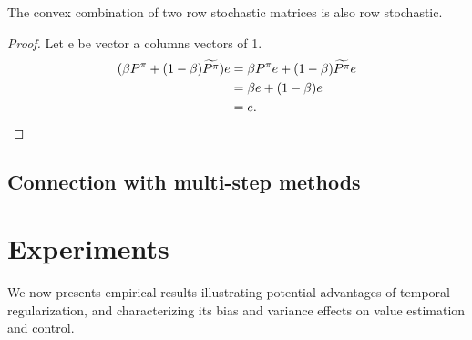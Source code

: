 \begin{lemma}
\label{lem:stochastic_matrix_convex_combination}
The convex combination of two row stochastic matrices is also row stochastic.
\end{lemma}
\begin{proof}
Let e be vector a columns vectors of 1.
\begin{equation}
\begin{split}
       (\beta P^{\pi} + (1-\beta) \widetilde{P^{\pi}})e &= \beta P^{\pi}e +  (1-\beta) \widetilde{P^{\pi}}e \\
       &= \beta e + (1-\beta) e\\
       &= e.
\end{split}
\end{equation}
\end{proof}
\subsection{Connection with multi-step methods}

\section{Experiments}


We now presents empirical results illustrating potential advantages of temporal regularization, and characterizing its bias and variance effects on value estimation and control.



